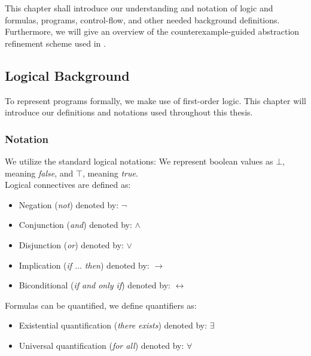 \newcommand{\stateSpace}{\ensuremath{S_{V, \mu}}}
\begin{comment}
	This chapter is mostly focused on trace abstraction $\rightarrow$  It introduces the reader to the concept of trace abstraction. \\
	- Introduce logic, logical variables, terms, formulas, transition formulas with primed and unprimed variables, programs, program states, loops $\rightarrow$  then program-, error traces, feasible and infeasible counterexamples, CFGs, interpolants. \\ - From intuitive to true definitions. \\
	Here the running example from the introduction gets dissected to illustrate the definitions. \\ 
	Further the problems loops can cause are introduced, followed by a definition of loop summaries $\rightarrow$ introduction reflexive transitive closure of a formula 
	15 pages
\end{comment}

This chapter shall introduce our understanding and notation of logic and formulas, programs, control-flow, and other needed background definitions. Furthermore, we will give an overview of the \traceabstraction \cite{10.1007/978-3-642-03237-0_7} counterexample-guided abstraction refinement scheme used in \ultimate.

\subsection{Logical Background}
To represent programs formally, we make use of first-order logic. This chapter will introduce our definitions and notations used throughout this thesis.

\subsubsection{Notation}
We utilize the standard logical notations: We represent boolean values as $\bot$, meaning \textsl{false}, and $\top$, meaning \textsl{true}. \\ Logical connectives are defined as:
\begin{itemize}
	\item Negation (\textsl{not}) denoted by: $\neg$
	\item Conjunction (\textsl{and}) denoted by: $\land$
	\item Disjunction (\textsl{or}) denoted by: $\lor$
	\item Implication (\textsl{if $\ldots$ then}) denoted by: $\rightarrow$
	\item Biconditional (\textsl{if and only if}) denoted by: $\leftrightarrow$
\end{itemize}
Formulas can be quantified, we define quantifiers as:
\begin{itemize}
	\item Existential quantification (\textsl{there exists}) denoted by: $\exists$
	\item Universal quantification (\textsl{for all}) denoted by: $\forall$
\end{itemize}

